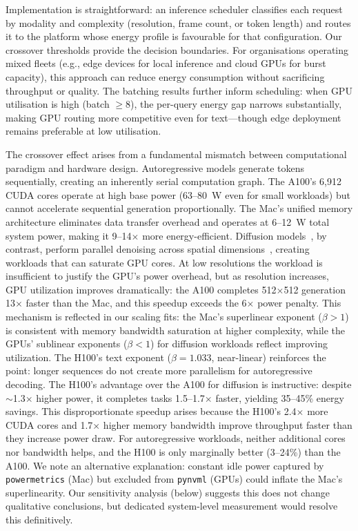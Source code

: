 \documentclass[preprint,12pt]{elsarticle}
\begin{document}
Implementation is straightforward: an inference scheduler classifies each request by modality and complexity (resolution, frame count, or token length) and routes it to the platform whose energy profile is favourable for that configuration. Our crossover thresholds provide the decision boundaries. For organisations operating mixed fleets (e.g., edge devices for local inference and cloud GPUs for burst capacity), this approach can reduce energy consumption without sacrificing throughput or quality. The batching results further inform scheduling: when GPU utilisation is high (batch $\geq$8), the per-query energy gap narrows substantially, making GPU routing more competitive even for text---though edge deployment remains preferable at low utilisation.

The crossover effect arises from a fundamental mismatch between computational paradigm and hardware design. Autoregressive models generate tokens sequentially, creating an inherently serial computation graph. The A100's 6,912 CUDA cores operate at high base power (63--80~W even for small workloads) but cannot accelerate sequential generation proportionally. The Mac's unified memory architecture eliminates data transfer overhead and operates at 6--12~W total system power, making it 9--14$\times$ more energy-efficient. Diffusion models~\cite{ho2020denoising}, by contrast, perform parallel denoising across spatial dimensions~\cite{rombach2022high,guo2024animatediff}, creating workloads that can saturate GPU cores. At low resolutions the workload is insufficient to justify the GPU's power overhead, but as resolution increases, GPU utilization improves dramatically: the A100 completes 512$\times$512 generation 13$\times$ faster than the Mac, and this speedup exceeds the 6$\times$ power penalty. This mechanism is reflected in our scaling fits: the Mac's superlinear exponent ($\beta > 1$) is consistent with memory bandwidth saturation at higher complexity, while the GPUs' sublinear exponents ($\beta < 1$) for diffusion workloads reflect improving utilization. The H100's text exponent ($\beta = 1.033$, near-linear) reinforces the point: longer sequences do not create more parallelism for autoregressive decoding. The H100's advantage over the A100 for diffusion is instructive: despite $\sim$1.3$\times$ higher power, it completes tasks 1.5--1.7$\times$ faster, yielding 35--45\% energy savings. This disproportionate speedup arises because the H100's 2.4$\times$ more CUDA cores and 1.7$\times$ higher memory bandwidth improve throughput faster than they increase power draw. For autoregressive workloads, neither additional cores nor bandwidth helps, and the H100 is only marginally better (3--24\%) than the A100. We note an alternative explanation: constant idle power captured by \texttt{powermetrics} (Mac) but excluded from \texttt{pynvml} (GPUs) could inflate the Mac's superlinearity. Our sensitivity analysis (below) suggests this does not change qualitative conclusions, but dedicated system-level measurement would resolve this definitively.
\end{document}
